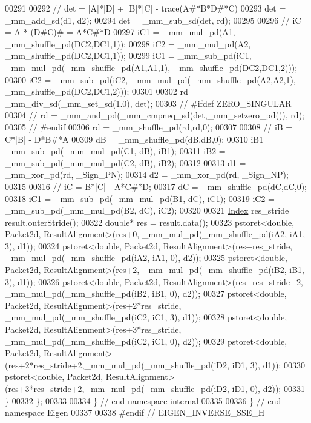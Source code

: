 \begin{DoxyCode}
00291 
00292     \textcolor{comment}{//  det = |A|*|D| + |B|*|C| - trace(A#*B*D#*C)}
00293     det = \_mm\_add\_sd(d1, d2);
00294     det = \_mm\_sub\_sd(det, rd);
00295 
00296     \textcolor{comment}{//  iC = A * (D#C)# = A*C#*D}
00297     iC1 = \_mm\_mul\_pd(A1, \_mm\_shuffle\_pd(DC2,DC1,1));
00298     iC2 = \_mm\_mul\_pd(A2, \_mm\_shuffle\_pd(DC2,DC1,1));
00299     iC1 = \_mm\_sub\_pd(iC1, \_mm\_mul\_pd(\_mm\_shuffle\_pd(A1,A1,1), \_mm\_shuffle\_pd(DC2,DC1,2)));
00300     iC2 = \_mm\_sub\_pd(iC2, \_mm\_mul\_pd(\_mm\_shuffle\_pd(A2,A2,1), \_mm\_shuffle\_pd(DC2,DC1,2)));
00301 
00302     rd = \_mm\_div\_sd(\_mm\_set\_sd(1.0), det);
00303 \textcolor{comment}{//     #ifdef ZERO\_SINGULAR}
00304 \textcolor{comment}{//         rd = \_mm\_and\_pd(\_mm\_cmpneq\_sd(det,\_mm\_setzero\_pd()), rd);}
00305 \textcolor{comment}{//     #endif}
00306     rd = \_mm\_shuffle\_pd(rd,rd,0);
00307 
00308     \textcolor{comment}{//  iB = C*|B| - D*B#*A}
00309     dB = \_mm\_shuffle\_pd(dB,dB,0);
00310     iB1 = \_mm\_sub\_pd(\_mm\_mul\_pd(C1, dB), iB1);
00311     iB2 = \_mm\_sub\_pd(\_mm\_mul\_pd(C2, dB), iB2);
00312 
00313     d1 = \_mm\_xor\_pd(rd, \_Sign\_PN);
00314     d2 = \_mm\_xor\_pd(rd, \_Sign\_NP);
00315 
00316     \textcolor{comment}{//  iC = B*|C| - A*C#*D;}
00317     dC = \_mm\_shuffle\_pd(dC,dC,0);
00318     iC1 = \_mm\_sub\_pd(\_mm\_mul\_pd(B1, dC), iC1);
00319     iC2 = \_mm\_sub\_pd(\_mm\_mul\_pd(B2, dC), iC2);
00320 
00321     \hyperlink{namespace_eigen_a62e77e0933482dafde8fe197d9a2cfde}{Index} res\_stride = result.outerStride();
00322     \textcolor{keywordtype}{double}* res = result.data();
00323     pstoret<double, Packet2d, ResultAlignment>(res+0,             \_mm\_mul\_pd(\_mm\_shuffle\_pd(iA2, iA1, 3), 
      d1));
00324     pstoret<double, Packet2d, ResultAlignment>(res+res\_stride,    \_mm\_mul\_pd(\_mm\_shuffle\_pd(iA2, iA1, 0), 
      d2));
00325     pstoret<double, Packet2d, ResultAlignment>(res+2,             \_mm\_mul\_pd(\_mm\_shuffle\_pd(iB2, iB1, 3), 
      d1));
00326     pstoret<double, Packet2d, ResultAlignment>(res+res\_stride+2,  \_mm\_mul\_pd(\_mm\_shuffle\_pd(iB2, iB1, 0), 
      d2));
00327     pstoret<double, Packet2d, ResultAlignment>(res+2*res\_stride,  \_mm\_mul\_pd(\_mm\_shuffle\_pd(iC2, iC1, 3), 
      d1));
00328     pstoret<double, Packet2d, ResultAlignment>(res+3*res\_stride,  \_mm\_mul\_pd(\_mm\_shuffle\_pd(iC2, iC1, 0), 
      d2));
00329     pstoret<double, Packet2d, ResultAlignment>(res+2*res\_stride+2,\_mm\_mul\_pd(\_mm\_shuffle\_pd(iD2, iD1, 3), 
      d1));
00330     pstoret<double, Packet2d, ResultAlignment>(res+3*res\_stride+2,\_mm\_mul\_pd(\_mm\_shuffle\_pd(iD2, iD1, 0), 
      d2));
00331   \}
00332 \};
00333 
00334 \} \textcolor{comment}{// end namespace internal}
00335 
00336 \} \textcolor{comment}{// end namespace Eigen}
00337 
00338 \textcolor{preprocessor}{#endif // EIGEN\_INVERSE\_SSE\_H}
\end{DoxyCode}

